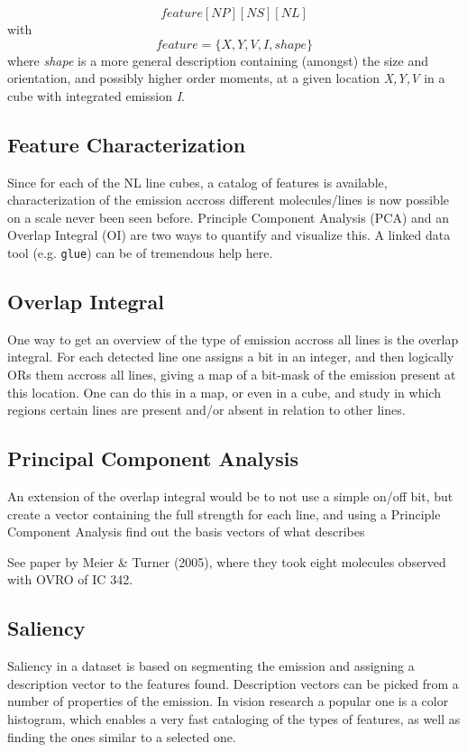 \documentclass[preprint]{aastex} %
\begin{document}
$$
   feature[NP][NS][NL]
$$
with
$$
   feature = \{X, Y, V, I, shape\}
$$
where {\it shape} is a more general description containing (amongst) the size
and orientation, and possibly higher order moments, at a given location
{\it X,Y,V} in a cube with integrated emission {\it I}. 


\subsection{Feature Characterization}

Since for each of the NL line cubes, a catalog of features is available,
characterization of the emission accross different molecules/lines is now 
possible on a scale never been seen before. Principle Component
Analysis (PCA) and an Overlap Integral (OI) are two ways to quantify
and visualize this. A linked data tool (e.g. {\tt glue}) can be 
of tremendous help here.

\subsection{Overlap Integral}

One way to get an overview of the type of emission accross all lines
is the overlap integral.
For each detected line one assigns a bit in an integer, and then logically ORs
them accross all lines, giving a map of a bit-mask of the emission present
at this location. One can do this in a map, or even in a cube, and study
in which regions certain lines are present and/or absent in relation
to other lines.

\subsection{Principal Component Analysis}

An extension of the overlap integral would be to not use a simple on/off bit,
but create a vector containing the full strength for each line, and using
a Principle Component Analysis find out the basis vectors of what describes


See paper by Meier \& Turner (2005), where they took eight molecules 
observed with OVRO of IC 342.

\subsection{Saliency}

Saliency in a dataset is based on segmenting the emission and assigning
a description vector to the features found. Description vectors can be
picked from a number of properties of the emission. In vision research
a popular one is a color histogram, which enables a very fast
cataloging of the types of features, as well as finding the ones similar
to a selected one.
\end{document}
